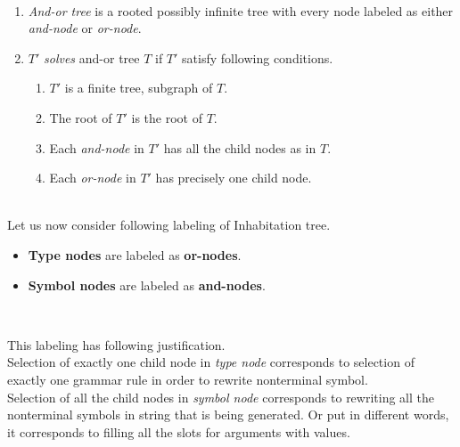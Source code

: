 \documentclass[12pt,a4paper]{report}
\newcommand{\Lets}{Let us\xspace}
\begin{document}
\begin{definition}
~
	\begin{enumerate}
	\item \textit{And-or tree} is a rooted possibly infinite 
	      tree with every node labeled as either \textit{and-node} 
	      or
	      \textit{or-node}.
	
    \item $T'$ \textit{solves} and-or tree $T$ if $T'$ satisfy following conditions.
	    \begin{enumerate}
	      \item $T'$ is a finite tree, subgraph of $T$. 
		  \item The root of $T'$ is the root of $T$.
		  \item Each \textit{and-node} in $T'$ has all the child nodes as in $T$.
		  \item Each \textit{or-node}  in $T'$ has precisely one child 
		      node.
	    \end{enumerate}
	
	\end{enumerate}

\end{definition}

~\\[1em]
\Lets now consider following labeling of Inhabitation tree.

\begin{itemize}
  \item \textbf{Type nodes}   are labeled as \textbf{or-nodes}.   
  \item \textbf{Symbol nodes} are labeled as \textbf{and-nodes}.
\end{itemize}~

This labeling has following justification.\\

Selection of exactly one
child node in \textit{type node} corresponds to selection of exactly one
grammar rule in order to rewrite nonterminal symbol.  \\

Selection of all the child nodes in \textit{symbol node} corresponds to 
rewriting all the nonterminal symbols in string that is being generated.
Or put in different words, it corresponds to filling all the slots
for arguments with values.\\  
\end{document}
